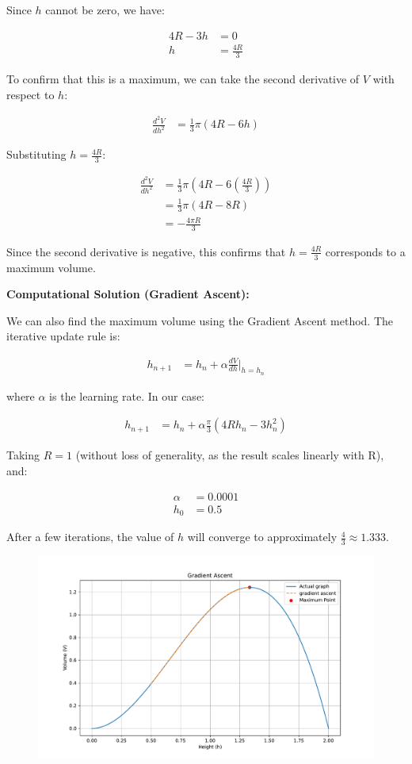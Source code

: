\documentclass[journal]{IEEEtran}
\begin{document}
Since $h$ cannot be zero, we have:

\begin{align}
4R - 3h &= 0 \\
h &= \frac{4R}{3}
\end{align}

To confirm that this is a maximum, we can take the second derivative of $V$ with respect to $h$:

\begin{align}
\frac{d^2V}{dh^2} &= \frac{1}{3} \pi (4R - 6h)
\end{align}

Substituting $h = \frac{4R}{3}$:

\begin{align}
\frac{d^2V}{dh^2} &= \frac{1}{3} \pi (4R - 6(\frac{4R}{3})) \\
&= \frac{1}{3} \pi (4R - 8R) \\
&= -\frac{4\pi R}{3}
\end{align}

Since the second derivative is negative, this confirms that $h = \frac{4R}{3}$ corresponds to a maximum volume.

\textbf{Computational Solution (Gradient Ascent):}

We can also find the maximum volume using the Gradient Ascent method. The iterative update rule is:

\begin{align}
h_{n+1} &= h_n + \alpha \frac{dV}{dh}\Big|_{h=h_n}
\end{align}

where $\alpha$ is the learning rate.  In our case:

\begin{align}
h_{n+1} &= h_n + \alpha \frac{\pi}{3} (4Rh_n - 3h_n^2)
\end{align}

Taking $R=1$ (without loss of generality, as the result scales linearly with R), and:

\begin{align}
\alpha &= 0.0001 \\
h_0 &= 0.5
\end{align}

After a few iterations, the value of $h$ will converge to approximately $\frac{4}{3} \approx 1.333$.
\begin{figure}[h]
\centering
\includegraphics[width=\columnwidth]{figs/plot.pdf}
\label{fig:Plot1} 
\end{figure}
\end{document}
